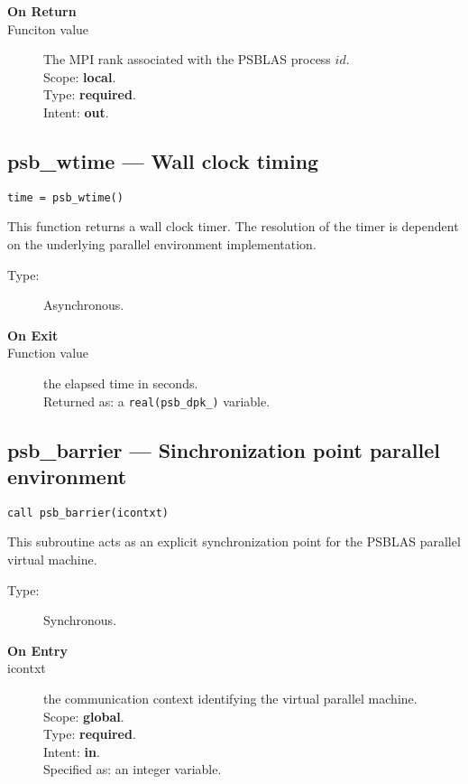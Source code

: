 \begin{description}
\item[\bf On Return]
\item[Funciton value] The MPI rank associated with the  PSBLAS process $id$.\\
Scope: {\bf local}.\\
Type: {\bf required}.\\
Intent: {\bf out}.\\
\end{description}




\clearpage\subsection*{psb\_wtime --- Wall clock timing}

\begin{verbatim}
time = psb_wtime()
\end{verbatim}

This function returns a wall clock timer. The resolution of the timer
is dependent on the underlying parallel environment implementation.
\begin{description}
\item[Type:] Asynchronous.
\item[\bf  On Exit ]
\item[Function value] the elapsed time in seconds.\\
Returned  as: a  \verb|real(psb_dpk_)|  variable.
\end{description}


\clearpage\subsection*{psb\_barrier --- Sinchronization point  parallel
  environment}

\begin{verbatim}
call psb_barrier(icontxt)
\end{verbatim}

This subroutine acts as an explicit synchronization point for  the  PSBLAS
parallel virtual  machine. 
\begin{description}
\item[Type:] Synchronous.
\item[\bf  On Entry ]
\item[icontxt] the communication context identifying the virtual
  parallel machine.\\
Scope: {\bf global}.\\
Type: {\bf required}.\\
Intent: {\bf in}.\\
Specified as: an integer variable.
\end{description}


